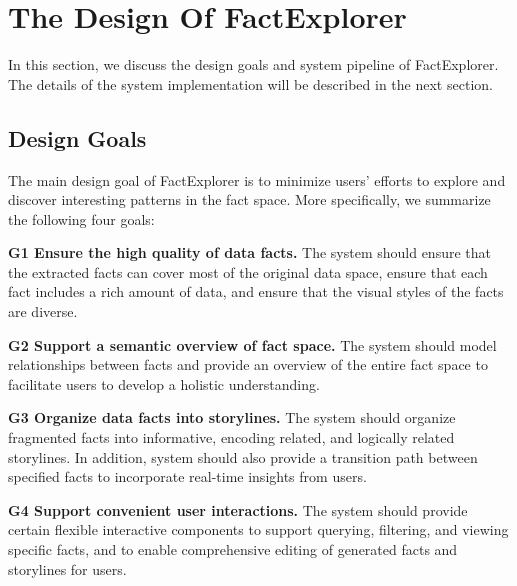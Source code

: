 \maketitle


\section{The Design Of FactExplorer} 
In this section, we discuss the design goals and system pipeline of FactExplorer. The details of the system implementation will be described in the next section.
\subsection{Design Goals} 
The main design goal of FactExplorer is to minimize users' efforts to explore and discover interesting patterns in the fact space. More specifically, we summarize the following four goals:

\textbf{G1 Ensure the high quality of data facts.} The system should ensure that the extracted facts can cover most of the original data space, ensure that each fact includes a rich amount of data, and ensure that the visual styles of the facts are diverse.

\textbf{G2 Support a semantic overview of fact space.} The system should model relationships between facts and provide an overview of the entire fact space to facilitate users to develop a holistic understanding.

\textbf{G3 Organize data facts into storylines.} The system should organize fragmented facts into informative, encoding related, and logically related storylines. In addition, system should also provide a transition path between specified facts to incorporate real-time insights from users.

\textbf{G4 Support convenient user interactions.} The system should provide certain flexible interactive components to support querying, filtering, and viewing specific facts, and to enable comprehensive editing of generated facts and storylines for users.
